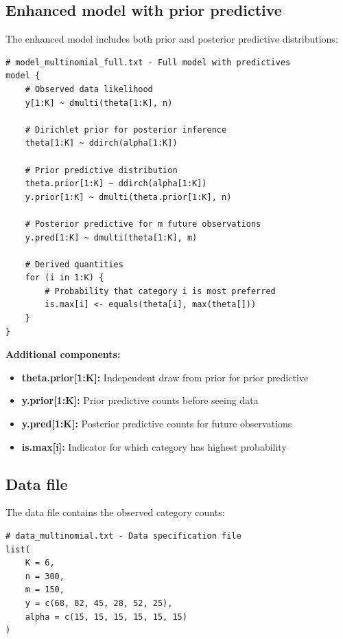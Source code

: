 \subsection{Enhanced model with prior predictive}

The enhanced model includes both prior and posterior predictive distributions:
\begin{codebox}
\begin{verbatim}
# model_multinomial_full.txt - Full model with predictives
model {
    # Observed data likelihood
    y[1:K] ~ dmulti(theta[1:K], n)

    # Dirichlet prior for posterior inference
    theta[1:K] ~ ddirch(alpha[1:K])

    # Prior predictive distribution
    theta.prior[1:K] ~ ddirch(alpha[1:K])
    y.prior[1:K] ~ dmulti(theta.prior[1:K], n)

    # Posterior predictive for m future observations
    y.pred[1:K] ~ dmulti(theta[1:K], m)

    # Derived quantities
    for (i in 1:K) {
        # Probability that category i is most preferred
        is.max[i] <- equals(theta[i], max(theta[]))
    }
}
\end{verbatim}
\end{codebox}
\textbf{Additional components:}
\begin{itemize}
\item \textbf{theta.prior[1:K]:} Independent draw from prior for prior predictive
\item \textbf{y.prior[1:K]:} Prior predictive counts before seeing data
\item \textbf{y.pred[1:K]:} Posterior predictive counts for future observations
\item \textbf{is.max[i]:} Indicator for which category has highest probability
\end{itemize}

\subsection{Data file}

The data file contains the observed category counts:
\begin{codebox}
\begin{verbatim}
# data_multinomial.txt - Data specification file
list(
    K = 6,
    n = 300,
    m = 150,
    y = c(68, 82, 45, 28, 52, 25),
    alpha = c(15, 15, 15, 15, 15, 15)
)
\end{verbatim}
\end{codebox}

